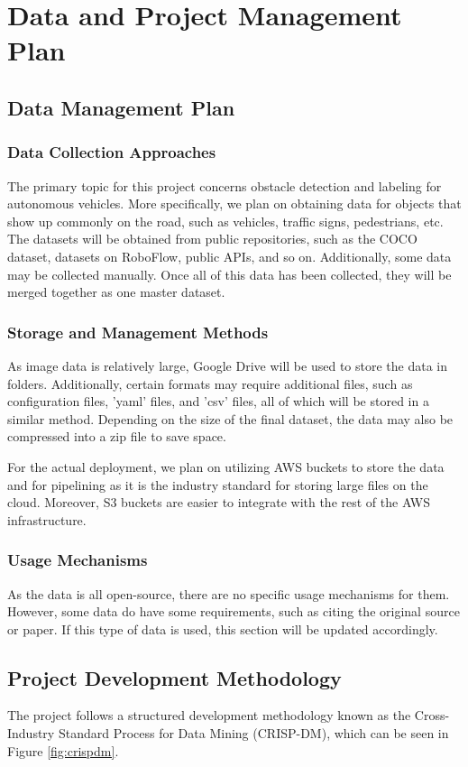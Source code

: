 \documentclass[stu,12pt,floatsintext]{apa7}
\begin{document}
\section{Data and Project Management Plan}
\subsection{Data Management Plan}
\subsubsection{Data Collection Approaches}
The primary topic for this project concerns obstacle detection and labeling for autonomous vehicles. More specifically, we plan on obtaining data for objects that show up commonly on the road, such as vehicles, traffic signs, pedestrians, etc.
The datasets will be obtained from public repositories, such as the COCO dataset, datasets on RoboFlow, public APIs, and so on. Additionally, some data may be collected manually. Once all of this data has been collected, they will be merged together as one master dataset.

\subsubsection{Storage and Management Methods}
As image data is relatively large, Google Drive will be used to store the data in folders. Additionally, certain formats may require additional files, such as configuration files, 'yaml' files, and 'csv' files, all of which will be stored in a similar method. Depending on the size of the final dataset, the data may also be compressed into a zip file to save space. 

For the actual deployment, we plan on utilizing AWS buckets to store the data and for pipelining as it is the industry standard for storing large files on the cloud. Moreover, S3 buckets are easier to integrate with the rest of the AWS infrastructure.

\subsubsection{Usage Mechanisms}
As the data is all open-source, there are no specific usage mechanisms for them. However, some data do have some requirements, such as citing the original source or paper. If this type of data is used, this section will be updated accordingly.


\subsection{Project Development Methodology}
The project follows a structured development methodology known as the Cross-Industry Standard Process for Data Mining (CRISP-DM), which can be seen in Figure \ref{fig:crispdm}. 
\end{document}
